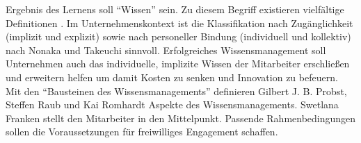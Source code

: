 \documentclass[12pt]{article}
\begin{document}

Ergebnis des Lernens soll ``Wissen'' sein. Zu diesem Begriff existieren
vielfältige Definitionen \cite{Schilcher:2006}. Im Unternehmenskontext ist die
Klassifikation nach Zugänglichkeit (implizit und explizit) sowie nach personeller
Bindung (individuell und kollektiv) nach Nonaka und Takeuchi \cite{Nonaka:1997}
sinnvoll. Erfolgreiches Wissensmanagement soll Unternehmen auch das individuelle,
implizite Wissen der Mitarbeiter erschließen und erweitern helfen um damit Kosten
zu senken und Innovation zu befeuern.
Mit den ``Bausteinen des Wissensmanagements'' definieren Gilbert J. B. Probst, 
Steffen Raub und Kai Romhardt \cite{Probst:2006} Aspekte des Wissensmanagements.
Swetlana Franken \cite{Franken:2007} stellt den Mitarbeiter in den Mittelpunkt.
Passende Rahmenbedingungen sollen die Voraussetzungen für freiwilliges Engagement
schaffen.
\end{document}

